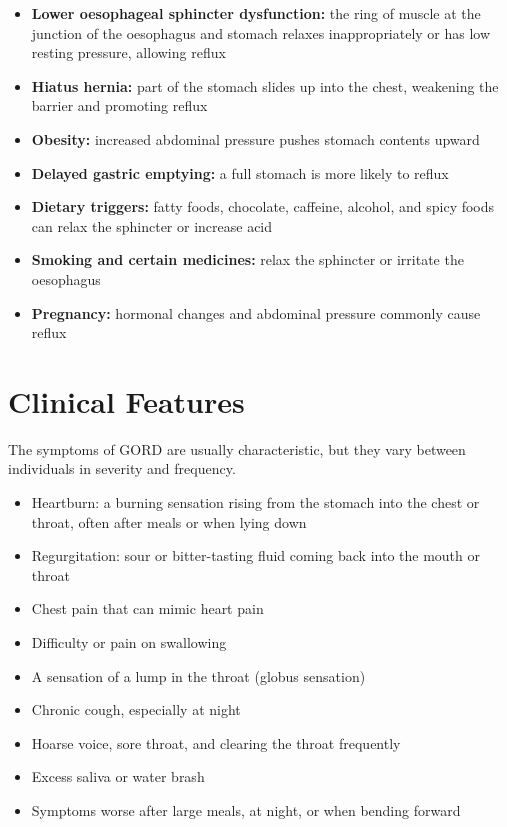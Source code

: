 \begin{itemize}
    \item \textbf{Lower oesophageal sphincter dysfunction:} the ring of muscle at the junction of the oesophagus and stomach relaxes inappropriately or has low resting pressure, allowing reflux
    \item \textbf{Hiatus hernia:} part of the stomach slides up into the chest, weakening the barrier and promoting reflux
    \item \textbf{Obesity:} increased abdominal pressure pushes stomach contents upward
    \item \textbf{Delayed gastric emptying:} a full stomach is more likely to reflux
    \item \textbf{Dietary triggers:} fatty foods, chocolate, caffeine, alcohol, and spicy foods can relax the sphincter or increase acid
    \item \textbf{Smoking and certain medicines:} relax the sphincter or irritate the oesophagus
    \item \textbf{Pregnancy:} hormonal changes and abdominal pressure commonly cause reflux
\end{itemize}

\section*{Clinical Features}
The symptoms of GORD are usually characteristic, but they vary between individuals in severity and frequency.

\begin{itemize}
    \item Heartburn: a burning sensation rising from the stomach into the chest or throat, often after meals or when lying down
    \item Regurgitation: sour or bitter-tasting fluid coming back into the mouth or throat
    \item Chest pain that can mimic heart pain
    \item Difficulty or pain on swallowing
    \item A sensation of a lump in the throat (globus sensation)
    \item Chronic cough, especially at night
    \item Hoarse voice, sore throat, and clearing the throat frequently
    \item Excess saliva or water brash
    \item Symptoms worse after large meals, at night, or when bending forward
\end{itemize}

